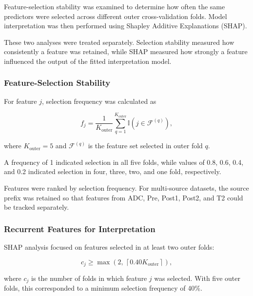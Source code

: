 \documentclass[12pt,twocolumn]{article}
\begin{document}
Feature-selection stability was examined to determine how often the same
predictors were selected across different outer cross-validation folds.
Model interpretation was then performed using Shapley Additive
Explanations (SHAP).

These two analyses were treated separately. Selection stability measured
how consistently a feature was retained, while SHAP measured how strongly
a feature influenced the output of the fitted interpretation model.

\subsubsection{Feature-Selection Stability}
\label{subsubsec:feature_selection_stability}

For feature \(j\), selection frequency was calculated as

\begin{equation}
f_j
=
\frac{1}{K_{\mathrm{outer}}}
\sum_{q=1}^{K_{\mathrm{outer}}}
\mathbb{I}
\left(
j\in\mathcal{F}^{(q)}
\right),
\label{eq:feature_selection_frequency}
\end{equation}

where \(K_{\mathrm{outer}}=5\) and
\(\mathcal{F}^{(q)}\) is the feature set selected in outer fold \(q\).

A frequency of 1 indicated selection in all five folds, while values of
0.8, 0.6, 0.4, and 0.2 indicated selection in four, three, two, and one
fold, respectively.

Features were ranked by selection frequency. For multi-source datasets,
the source prefix was retained so that features from ADC, Pre, Post1,
Post2, and T2 could be tracked separately.

\subsubsection{Recurrent Features for Interpretation}
\label{subsubsec:stable_features_for_interpretation}

SHAP analysis focused on features selected in at least two outer folds:

\begin{equation}
c_j
\geq
\max
\left(
2,\,
\left\lceil
0.40K_{\mathrm{outer}}
\right\rceil
\right),
\label{eq:stable_feature_threshold}
\end{equation}

where \(c_j\) is the number of folds in which feature \(j\) was selected.
With five outer folds, this corresponded to a minimum selection frequency
of 40\%.
\end{document}
